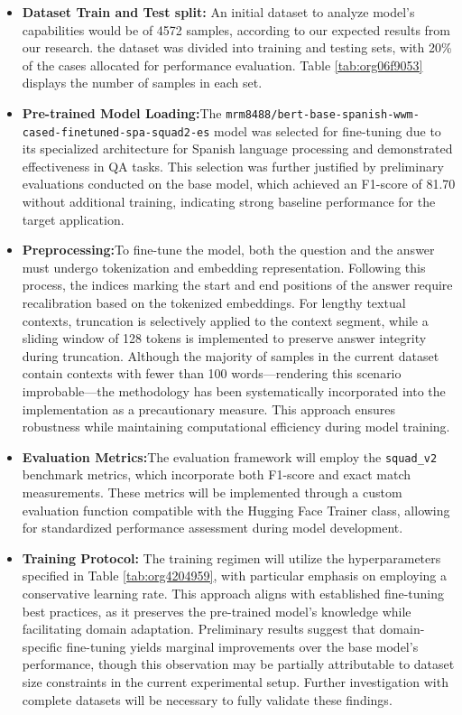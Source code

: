 \documentclass[onecolumn, journal, english, 12pt, a4paper]{IEEEtran} %
\theoremstyle{definition}
\begin{document}
\begin{itemize}
\item \textbf{Dataset Train and Test split:} An initial dataset to
  analyze model's capabilities would be of 4572 samples, according to
  our expected results from our research. the dataset was divided into
  training and testing sets, with 20\% of the cases allocated for
  performance evaluation. Table \ref{tab:org06f9053} displays the
  number of samples in each set.
\item \textbf{Pre-trained Model Loading:}The
  \texttt{mrm8488/bert-base-spanish-wwm-cased-finetuned-spa-squad2-es}
  model was selected for fine-tuning due to its specialized
  architecture for Spanish language processing and demonstrated
  effectiveness in QA tasks. This selection was further justified by
  preliminary evaluations conducted on the base model, which achieved
  an F1-score of 81.70 without additional training, indicating strong
  baseline performance for the target application.
\item \textbf{Preprocessing:}To fine-tune the model, both the question
  and the answer must undergo tokenization and embedding
  representation. Following this process, the indices marking the
  start and end positions of the answer require recalibration based on
  the tokenized embeddings. For lengthy textual contexts, truncation
  is selectively applied to the context segment, while a sliding
  window of 128 tokens is implemented to preserve answer integrity
  during truncation. Although the majority of samples in the current
  dataset contain contexts with fewer than 100 words—rendering this
  scenario improbable—the methodology has been systematically
  incorporated into the implementation as a precautionary
  measure. This approach ensures robustness while maintaining
  computational efficiency during model training.
\item \textbf{Evaluation Metrics:}The evaluation framework will employ
  the \texttt{squad\_v2} benchmark metrics, which incorporate both
  F1-score and exact match measurements. These metrics will be
  implemented through a custom evaluation function compatible with the
  Hugging Face Trainer class, allowing for standardized performance
  assessment during model development.
\item \textbf{Training Protocol:} The training regimen will utilize
  the hyperparameters specified in Table \ref{tab:org4204959}, with
  particular emphasis on employing a conservative learning rate. This
  approach aligns with established fine-tuning best practices, as it
  preserves the pre-trained model's knowledge while facilitating
  domain adaptation. Preliminary results suggest that domain-specific
  fine-tuning yields marginal improvements over the base model's
  performance, though this observation may be partially attributable
  to dataset size constraints in the current experimental
  setup. Further investigation with complete datasets will be
  necessary to fully validate these findings.
\end{itemize}
\end{document}
